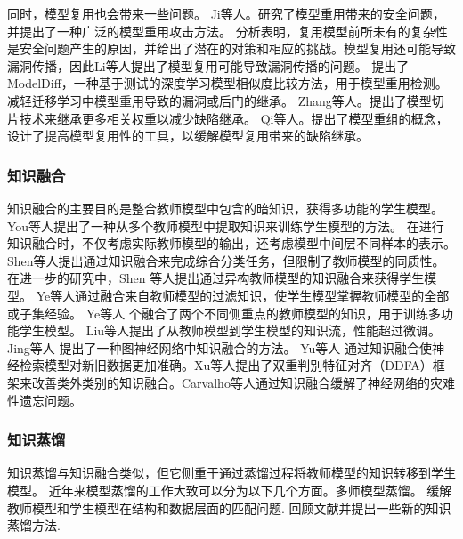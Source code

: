\documentclass[fontset=macnew,UTF8]{article} %
\begin{document}
同时，模型复用也会带来一些问题。 Ji等人\cite{ji2018model}。研究了模型重用带来的安全问题，并提出了一种广泛的模型重用攻击方法。 分析表明，复用模型前所未有的复杂性是安全问题产生的原因，并给出了潜在的对策和相应的挑战。模型复用还可能导致漏洞传播，因此Li等人提出了模型复用可能导致漏洞传播的问题。 \cite{li2021modeldiff}提出了ModelDiff，一种基于测试的深度学习模型相似度比较方法，用于模型重用检测。 减轻迁移学习中模型重用导致的漏洞或后门的继承。 Zhang等人\cite{zhang2022remos}。提出了模型切片技术来继承更多相关权重以减少缺陷继承。 Qi\cite{qi2023reusing}等人。提出了模型重组的概念，设计了提高模型复用性的工具，以缓解模型复用带来的缺陷继承。
\subsubsection{知识融合}
知识融合的主要目的是整合教师模型中包含的暗知识，获得多功能的学生模型。 You等人\cite{you2017learning}提出了一种从多个教师模型中提取知识来训练学生模型的方法。 在进行知识融合时，不仅考虑实际教师模型的输出，还考虑模型中间层不同样本的表示。 Shen等人\cite{shen2019amalgamating}提出通过知识融合来完成综合分类任务，但限制了教师模型的同质性。 在进一步的研究中，Shen 等人\cite{shen2019customizing}提出通过异构教师模型的知识融合来获得学生模型。 Ye等人\cite{ye2019amalgamating}通过融合来自教师模型的过滤知识，使学生模型掌握教师模型的全部或子集经验。 Ye等人\cite{ye2019student} 个融合了两个不同侧重点的教师模型的知识，用于训练多功能学生模型。 Liu等人\cite{liu2019knowledge}提出了从教师模型到学生模型的知识流，性能超过微调。 Jing等人\cite{jing2021amalgamating} 提出了一种图神经网络中知识融合的方法。 Yu等人\cite{yu2022arm} 通过知识融合使神经检索模型对新旧数据更加准确。Xu等人\cite{xu2022hierarchical}提出了双重判别特征对齐（DDFA）框架来改善类外类别的知识融合。Carvalho等人\cite{de2022class}通过知识融合缓解了神经网络的灾难性遗忘问题。
\subsubsection{知识蒸馏}
知识蒸馏与知识融合类似，但它侧重于通过蒸馏过程将教师模型的知识转移到学生模型。 近年来模型蒸馏的工作大致可以分为以下几个方面。多师模型蒸馏\cite{zhao2020highlight,park2020feature}。 缓解教师模型和学生模型在结构和数据层面的匹配问题\cite{zhu2021student,mirzadeh2020improved,fang2021mosaicking}. 回顾文献\cite{wang2021knowledge,gou2021knowledge}并提出一些新的知识蒸馏方法\cite{li2022distilling,chen2022knowledge}.
\end{document}
